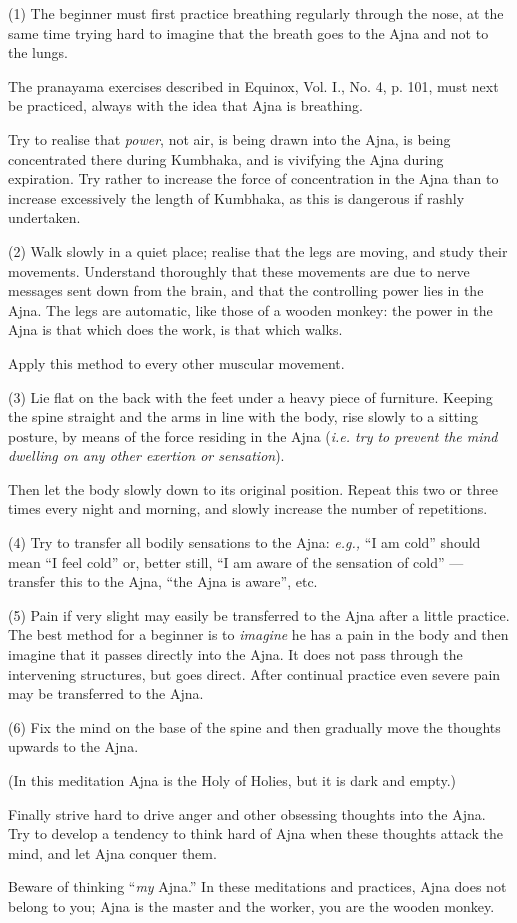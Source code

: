 (1) The beginner must first practice breathing regularly through the nose, at the same time trying hard to imagine that the breath goes to the Ajna and not to the lungs.

The pranayama exercises described in Equinox, Vol. I., No. 4, p. 101, must next be practiced, always with the idea that Ajna is breathing.

Try to realise that \textit{power}, not air, is being drawn into the Ajna, is being concentrated there during Kumbhaka, and is vivifying the Ajna during expiration. Try rather to increase the force of concentration in the Ajna than to increase excessively the length of Kumbhaka, as this is dangerous if rashly undertaken.

(2) Walk slowly in a quiet place; realise that the legs are moving, and study their movements. Understand thoroughly that these movements are due to nerve messages sent down from the brain, and that the controlling power lies in the Ajna. The legs are automatic, like those of a wooden monkey: the power in the Ajna is that which does the work, is that which walks.

Apply this method to every other muscular movement.

(3) Lie flat on the back with the feet under a heavy piece of furniture. Keeping the spine straight and the arms in line with the body, rise slowly to a sitting posture, by means of the force residing in the Ajna (\textit{i.e. try to prevent the mind dwelling on any other exertion or sensation}).

Then let the body slowly down to its original position. Repeat this two or three times every night and morning, and slowly increase the number of repetitions.

(4) Try to transfer all bodily sensations to the Ajna: \textit{e.g.,} \enquote{I am cold} should mean \enquote{I feel cold} or, better still, \enquote{I am aware of the sensation of cold} --- transfer this to the Ajna, \enquote{the Ajna is aware}, etc.

(5) Pain if very slight may easily be transferred to the Ajna after a little practice. The best method for a beginner is to \textit{imagine} he has a pain in the body and then imagine that it passes directly into the Ajna. It does not pass through the intervening structures, but goes direct. After continual practice even severe pain may be transferred to the Ajna.

(6) Fix the mind on the base of the spine and then gradually move the thoughts upwards to the Ajna.

(In this meditation Ajna is the Holy of Holies, but it is dark and empty.)

Finally strive hard to drive anger and other obsessing thoughts into the Ajna. Try to develop a tendency to think hard of Ajna when these thoughts attack the mind, and let Ajna conquer them.

Beware of thinking \enquote{\textit{my} Ajna.} In these meditations and practices, Ajna does not belong to you; Ajna is the master and the worker, you are the wooden monkey.

